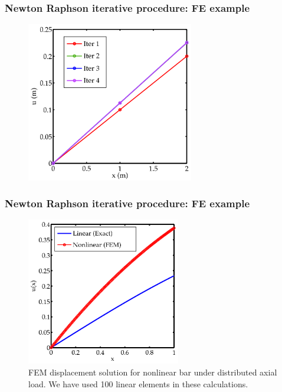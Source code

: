 \documentclass[notes]{beamer}
\begin{document}
\begin{frame}
\frametitle{Newton Raphson iterative procedure: FE example}
\begin{figure}[ht]
	\centering
	\includegraphics[width=0.65\textwidth]{figs/nr-linear.png}
\end{figure}
\end{frame}

\begin{frame}
\frametitle{Newton Raphson iterative procedure: FE example}
\begin{figure}[ht]
\centering
\includegraphics[width=0.6\textwidth]{figs/nr-linear-100.png}
\caption{FEM displacement solution for nonlinear bar under distributed axial load. We have used 100 linear elements in these calculations.}
\end{figure}
\end{frame}
\end{document}
